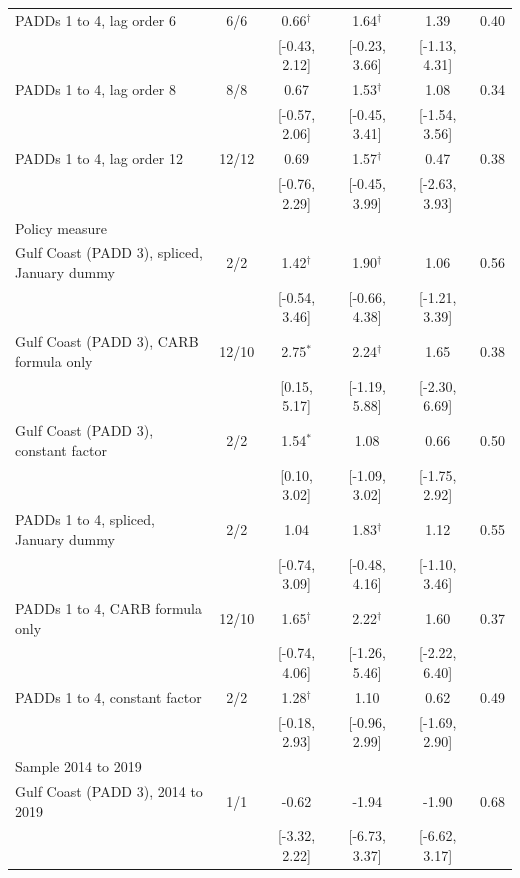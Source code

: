 \begin{table}[htbp]
\begin{tabular}{lccccc}
PADDs 1 to 4, lag order 6 & 6/6 & 0.66$^{\dagger}$ & 1.64$^{\dagger}$ & 1.39 & 0.40 \\
\footnotesize  &  & [-0.43, 2.12] & [-0.23, 3.66] & [-1.13, 4.31] &  \\[2pt]
PADDs 1 to 4, lag order 8 & 8/8 & 0.67 & 1.53$^{\dagger}$ & 1.08 & 0.34 \\
\footnotesize  &  & [-0.57, 2.06] & [-0.45, 3.41] & [-1.54, 3.56] &  \\[2pt]
PADDs 1 to 4, lag order 12 & 12/12 & 0.69 & 1.57$^{\dagger}$ & 0.47 & 0.38 \\
\footnotesize  &  & [-0.76, 2.29] & [-0.45, 3.99] & [-2.63, 3.93] &  \\[2pt]
\midrule
\multicolumn{6}{l}{Policy measure} \\
\midrule
Gulf Coast (PADD 3), spliced, January dummy & 2/2 & 1.42$^{\dagger}$ & 1.90$^{\dagger}$ & 1.06 & 0.56 \\
\footnotesize  &  & [-0.54, 3.46] & [-0.66, 4.38] & [-1.21, 3.39] &  \\[2pt]
Gulf Coast (PADD 3), CARB formula only & 12/10 & 2.75$^{*}$ & 2.24$^{\dagger}$ & 1.65 & 0.38 \\
\footnotesize  &  & [0.15, 5.17] & [-1.19, 5.88] & [-2.30, 6.69] &  \\[2pt]
Gulf Coast (PADD 3), constant factor & 2/2 & 1.54$^{*}$ & 1.08 & 0.66 & 0.50 \\
\footnotesize  &  & [0.10, 3.02] & [-1.09, 3.02] & [-1.75, 2.92] &  \\[2pt]
PADDs 1 to 4, spliced, January dummy & 2/2 & 1.04 & 1.83$^{\dagger}$ & 1.12 & 0.55 \\
\footnotesize  &  & [-0.74, 3.09] & [-0.48, 4.16] & [-1.10, 3.46] &  \\[2pt]
PADDs 1 to 4, CARB formula only & 12/10 & 1.65$^{\dagger}$ & 2.22$^{\dagger}$ & 1.60 & 0.37 \\
\footnotesize  &  & [-0.74, 4.06] & [-1.26, 5.46] & [-2.22, 6.40] &  \\[2pt]
PADDs 1 to 4, constant factor & 2/2 & 1.28$^{\dagger}$ & 1.10 & 0.62 & 0.49 \\
\footnotesize  &  & [-0.18, 2.93] & [-0.96, 2.99] & [-1.69, 2.90] &  \\[2pt]
\midrule
\multicolumn{6}{l}{Sample 2014 to 2019} \\
\midrule
Gulf Coast (PADD 3), 2014 to 2019 & 1/1 & -0.62 & -1.94 & -1.90 & 0.68 \\
\footnotesize  &  & [-3.32, 2.22] & [-6.73, 3.37] & [-6.62, 3.17] &  \\[2pt]

\end{tabular}
\end{table}
